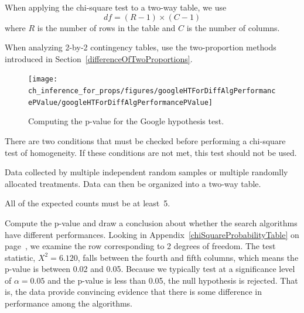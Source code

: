 \begin{termBox}{
When applying the chi-square test to a two-way table, we use
$$ df = (R-1)\times (C-1) $$
where $R$ is the number of rows in the table and $C$ is the number of columns.}
\end{termBox}

\begin{tipBox}{
When analyzing 2-by-2 contingency tables, use the two-proportion methods introduced in Section~\ref{differenceOfTwoProportions}.}
\end{tipBox}

\begin{figure}[h]
\centering
\texttt{[image: ch\_inference\_for\_props/figures/googleHTForDiffAlgPerformancePValue/googleHTForDiffAlgPerformancePValue]}
\caption{Computing the p-value for the Google hypothesis test.}
\label{googleHTForDiffAlgPerformancePValue}
\end{figure}

\begin{tipBox}{
There are two conditions that must be checked before performing a chi-square test of homogeneity. If these conditions are not met, this test should not be used.\vspace{-1mm}
\begin{description}
\setlength{\itemsep}{0mm}
\item[Mutliple random samples or randomly allocated treatments. ]Data collected by multiple independent random samples or multiple randomlly allocated treatments. Data can then be organized into a two-way table.
\item[All Expected Counts at least 5. ] All of the expected counts must be at least~5.
\vspace{-1mm}
\end{description}}
\end{tipBox}

\begin{example}{Compute the p-value and draw a conclusion about whether the search algorithms have different performances.}
Looking in Appendix~\ref{chiSquareProbabilityTable} on page~\pageref{chiSquareProbabilityTable}, we examine the row corresponding to 2 degrees of freedom. The test statistic, $X^2=6.120$, falls between the fourth and fifth columns, which means the p-value is between 0.02 and 0.05. Because we typically test at a significance level of $\alpha=0.05$ and the p-value is less than 0.05, the null hypothesis is rejected. That is, the data provide convincing evidence that there is some difference in performance among the algorithms.
\end{example}

